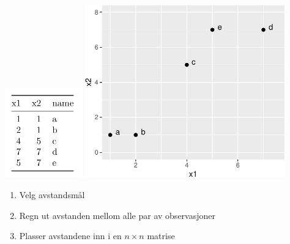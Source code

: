 \documentclass[10pt,ignorenonframetext,]{beamer}
\providecommand{\tightlist}{%
  \setlength{\itemsep}{0pt}\setlength{\parskip}{0pt}}
\begin{document}
\begin{frame}

\includegraphics[width=0.25\textwidth,height=\textheight]{table.png}
\includegraphics[width=0.65\textwidth,height=\textheight]{exampleplot-1.pdf}

\begin{enumerate}
[1)]
\tightlist
\item
  Velg avstandsmål
\item
  Regn ut avstanden mellom alle par av observasjoner
\item
  Plasser avstandene inn i en \(n\times n\) matrise
\end{enumerate}

\end{frame}
\end{document}
